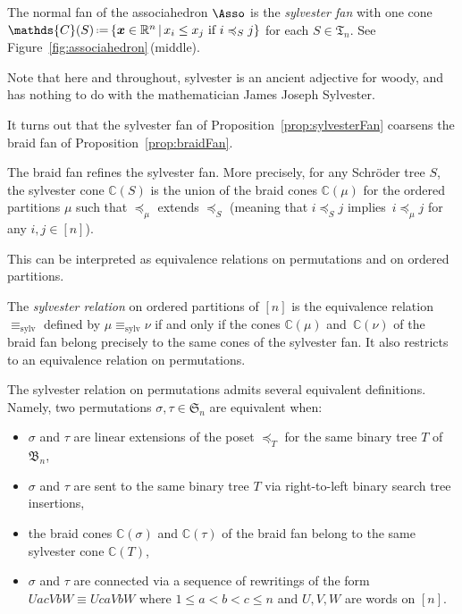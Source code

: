 \documentclass[AHL,Unicode,longabstracts,published]{cedram}
\newcommand{\R}{\mathbb{R}}
\renewcommand{\b}[1]{\boldsymbol{#1}}
\newcommand{\f}[1]{\mathfrak{#1}}
\newcommand{\eqdef}{\mbox{\,\raisebox{0.2ex}{\scriptsize\ensuremath{\mathrm:}}\ensuremath{=}\,}}
\newcommand{\polytope}[1]{\mathds{#1}}
\newcommand{\sylv}{\mathrm{sylv}}
\begin{document}
\begin{prop}\label{prop:sylvesterFan}
The normal fan of the associahedron $\Asso$ is the
\emph{sylvester fan} with one cone $\polytope{C}(S) \eqdef \{\b{x} \in
\R^n\,|\,x_i \le x_j \text{ if } i \preccurlyeq_S j\}$ for each $S \in \f{T}_n$. See Figure~\ref{fig:associahedron}\,(middle).
\end{prop}

Note that here and throughout, sylvester is an ancient adjective for woody, and has nothing to do with the mathematician James Joseph Sylvester.

It turns out that the sylvester fan of Proposition~\ref{prop:sylvesterFan} coarsens the braid fan of Proposition~\ref{prop:braidFan}.

\begin{prop}\label{prop:fanRefinementSylvester}
The braid fan refines the sylvester fan. More precisely, for any Schr\"oder tree $S$, the sylvester cone $\polytope{C}(S)$ is the union of the braid cones $\polytope{C}(\mu)$ for the ordered partitions $\mu$ such that $\preccurlyeq_\mu$ extends $\preccurlyeq_S$ (meaning that $i \!\preccurlyeq_S\! j$ implies~$i \!\preccurlyeq_\mu\! j$ for any $i,j \in [n]$).
\end{prop}

This can be interpreted as equivalence relations on permutations and on ordered partitions.

\begin{defi}\label{def:sylvesterRelation}
The
\emph{sylvester relation} on ordered partitions of $[n]$ is the equivalence relation $\equiv_\sylv$ defined by $\mu \equiv_\sylv \nu$ if and only if the cones $\polytope{C}(\mu)$ and~$\polytope{C}(\nu)$ of the braid fan belong precisely to the same cones of the sylvester fan. It also restricts to an equivalence relation on permutations.
\end{defi}

\begin{rema}\label{rem:sylvesterRelation}
The sylvester relation on permutations admits several equivalent definitions. Namely, two permutations $\sigma, \tau \in \f{S}_n$ are equivalent when:
\begin{itemize}
\item $\sigma$ and $\tau$ are linear extensions of the poset $\preccurlyeq_T$ for the same binary tree $T$ of~$\f{B}_n$,
\item $\sigma$ and $\tau$ are sent to the same binary tree $T$ via right-to-left binary search tree insertions,
\item the braid cones $\polytope{C}(\sigma)$ and $\polytope{C}(\tau)$ of the braid fan belong to the same sylvester cone $\polytope{C}(T)$,
\item $\sigma$ and $\tau$ are connected via a sequence of rewritings of the form $UacVbW \equiv UcaVbW$ where $1 \le a < b < c \le n$ and $U,V,W$ are words on $[n]$.
\end{itemize}
\end{rema}
\end{document}
